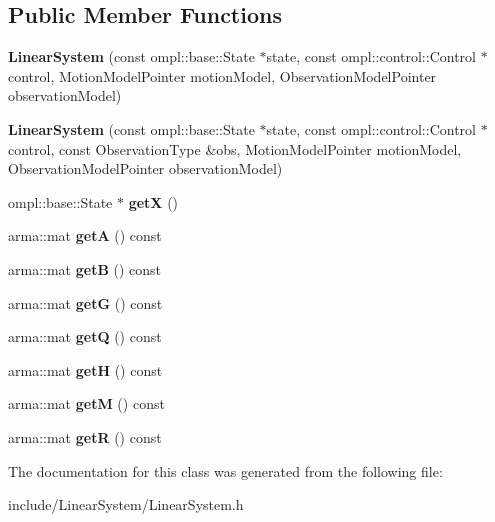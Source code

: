 \subsection*{\-Public \-Member \-Functions}
\begin{DoxyCompactItemize}
\item 
\hypertarget{class_linear_system_a6f05277076a4302dbcfa9646232871dc}{{\bfseries \-Linear\-System} (const ompl\-::base\-::\-State $\ast$state, const ompl\-::control\-::\-Control $\ast$control, \-Motion\-Model\-Pointer motion\-Model, \-Observation\-Model\-Pointer observation\-Model)}\label{class_linear_system_a6f05277076a4302dbcfa9646232871dc}

\item 
\hypertarget{class_linear_system_a428c800b858ed6c6d63230c64e470208}{{\bfseries \-Linear\-System} (const ompl\-::base\-::\-State $\ast$state, const ompl\-::control\-::\-Control $\ast$control, const \-Observation\-Type \&obs, \-Motion\-Model\-Pointer motion\-Model, \-Observation\-Model\-Pointer observation\-Model)}\label{class_linear_system_a428c800b858ed6c6d63230c64e470208}

\item 
\hypertarget{class_linear_system_a7d556441c0f68f6ccfdde32b72f888b6}{ompl\-::base\-::\-State $\ast$ {\bfseries get\-X} ()}\label{class_linear_system_a7d556441c0f68f6ccfdde32b72f888b6}

\item 
\hypertarget{class_linear_system_aa9b7cdb3f9e09902fbe9b1d65d932edb}{arma\-::mat {\bfseries get\-A} () const }\label{class_linear_system_aa9b7cdb3f9e09902fbe9b1d65d932edb}

\item 
\hypertarget{class_linear_system_af1a0b99cb2b4e30eb61b1bee328fb0bd}{arma\-::mat {\bfseries get\-B} () const }\label{class_linear_system_af1a0b99cb2b4e30eb61b1bee328fb0bd}

\item 
\hypertarget{class_linear_system_aaadd9d063ecdb4afb67ae4522cf921a7}{arma\-::mat {\bfseries get\-G} () const }\label{class_linear_system_aaadd9d063ecdb4afb67ae4522cf921a7}

\item 
\hypertarget{class_linear_system_ab95733398800308c2e69522d37f2a005}{arma\-::mat {\bfseries get\-Q} () const }\label{class_linear_system_ab95733398800308c2e69522d37f2a005}

\item 
\hypertarget{class_linear_system_a678fe164168013e7a4a4fc97e6716fa6}{arma\-::mat {\bfseries get\-H} () const }\label{class_linear_system_a678fe164168013e7a4a4fc97e6716fa6}

\item 
\hypertarget{class_linear_system_a4b69f2e4c7b6144c6abb8abf725ce063}{arma\-::mat {\bfseries get\-M} () const }\label{class_linear_system_a4b69f2e4c7b6144c6abb8abf725ce063}

\item 
\hypertarget{class_linear_system_aaad4f742dcb61f776d5de952977a745e}{arma\-::mat {\bfseries get\-R} () const }\label{class_linear_system_aaad4f742dcb61f776d5de952977a745e}

\end{DoxyCompactItemize}


\-The documentation for this class was generated from the following file\-:\begin{DoxyCompactItemize}
\item 
include/\-Linear\-System/\-Linear\-System.\-h\end{DoxyCompactItemize}
